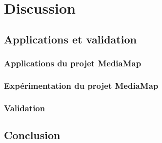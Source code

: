 

\part*{Discussion}
\chapter{Applications et validation}\label{chap:app}
\section{Applications du projet MediaMap}\label{sec:app}
\section{Expérimentation du projet MediaMap}\label{sec:xp}
\section{Validation}\label{sec:val}

\chapter*{Conclusion}\label{chap:cc}



